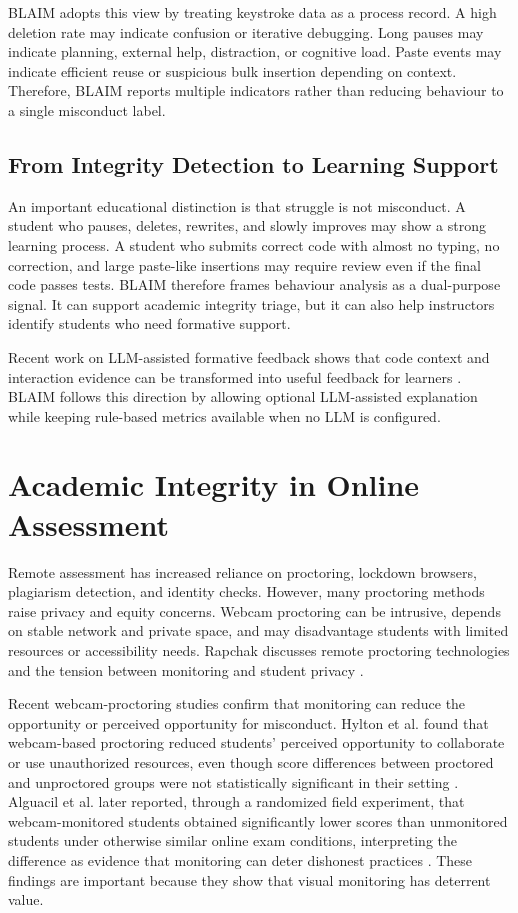 BLAIM adopts this view by treating keystroke data as a process record. A high deletion rate may indicate confusion or iterative debugging. Long pauses may indicate planning, external help, distraction, or cognitive load. Paste events may indicate efficient reuse or suspicious bulk insertion depending on context. Therefore, BLAIM reports multiple indicators rather than reducing behaviour to a single misconduct label.

\subsection{From Integrity Detection to Learning Support}
\label{subsec:integrity-learning}

An important educational distinction is that struggle is not misconduct. A student who pauses, deletes, rewrites, and slowly improves may show a strong learning process. A student who submits correct code with almost no typing, no correction, and large paste-like insertions may require review even if the final code passes tests. BLAIM therefore frames behaviour analysis as a dual-purpose signal. It can support academic integrity triage, but it can also help instructors identify students who need formative support.

Recent work on LLM-assisted formative feedback shows that code context and interaction evidence can be transformed into useful feedback for learners \cite{nguyen2023gpt4}. BLAIM follows this direction by allowing optional LLM-assisted explanation while keeping rule-based metrics available when no LLM is configured.

\section{Academic Integrity in Online Assessment}
\label{sec:lit-integrity}

Remote assessment has increased reliance on proctoring, lockdown browsers, plagiarism detection, and identity checks. However, many proctoring methods raise privacy and equity concerns. Webcam proctoring can be intrusive, depends on stable network and private space, and may disadvantage students with limited resources or accessibility needs. Rapchak discusses remote proctoring technologies and the tension between monitoring and student privacy \cite{rapchak2020remote}.

Recent webcam-proctoring studies confirm that monitoring can reduce the opportunity or perceived opportunity for misconduct. Hylton et al. found that webcam-based proctoring reduced students' perceived opportunity to collaborate or use unauthorized resources, even though score differences between proctored and unproctored groups were not statistically significant in their setting \cite{hylton2016webcam}. Alguacil et al. later reported, through a randomized field experiment, that webcam-monitored students obtained significantly lower scores than unmonitored students under otherwise similar online exam conditions, interpreting the difference as evidence that monitoring can deter dishonest practices \cite{alguacil2023academic}. These findings are important because they show that visual monitoring has deterrent value.

